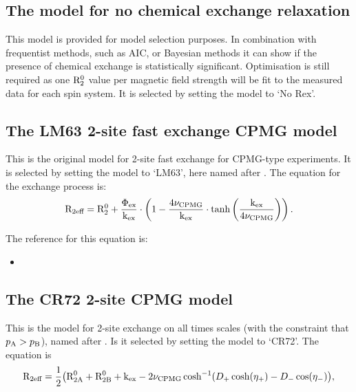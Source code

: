 
\subsection{The model for no chemical exchange relaxation}

This model is provided for model selection purposes.  In combination with frequentist methods, such as AIC, or Bayesian methods it can show if the presence of chemical exchange is statistically significant.  Optimisation is still required as one $\mathrm{R}_2^0$ value per magnetic field strength will be fit to the measured data for each spin system.  It is selected by setting the model to `No Rex'.




\subsection{The LM63 2-site fast exchange CPMG model}

This is the original model for 2-site fast exchange for CPMG-type experiments.  It is selected by setting the model to `LM63', here named after \citet{LuzMeiboom63}.  The equation for the exchange process is:
\begin{equation}
    \mathrm{R}_{2\textrm{eff}} = \mathrm{R}_2^0 + \frac{\Phi_\textrm{ex}}{\textrm{k}_\textrm{ex}} \cdot \left( 1 - \frac{4\nu_\textrm{CPMG}}{\textrm{k}_\textrm{ex}} \cdot \tanh \left( \frac{\textrm{k}_\textrm{ex}}{4\nu_\textrm{CPMG}} \right) \right) .
\end{equation}

The reference for this equation is:
\begin{itemize}
\item {}
\end{itemize}




\subsection{The CR72 2-site CPMG model}

This is the model for 2-site exchange on all times scales (with the constraint that $p_\textrm{A} > p_\textrm{B}$), named after \citet{CarverRichards72}.  Is it selected by setting the model to `CR72'.  The equation is
\begin{equation}
    \mathrm{R}_{2\textrm{eff}} = \frac{1}{2} \big( \textrm{R}_\textrm{2A}^0 + \textrm{R}_\textrm{2B}^0 + \textrm{k}_\textrm{ex} - 2\nu_\textrm{CPMG}\cosh^{-1} (D_+\cosh(\eta_+) - D_-\cos(\eta_-) \big) ,
\end{equation}

